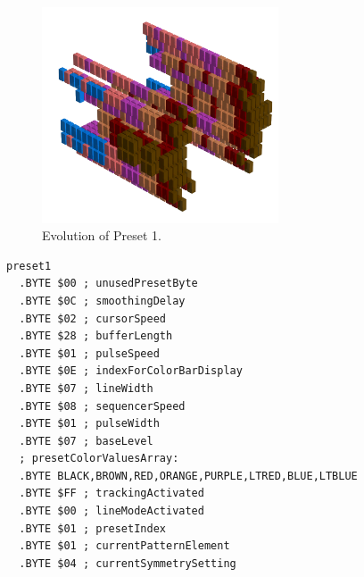 \begin{minipage}[b]{0.48\linewidth}
\begin{figure}[H]                                                          
  \centering                                                             
  \begin{adjustbox}{width=7cm,center}                                   
  \includegraphics[width=7cm]{src/presets/pattern1-45.png}%
  \end{adjustbox}                                                        
\caption{Evolution of Preset 1.}                                           
\end{figure}                                                               
\end{minipage}
\hspace{0.1cm}
\begin{minipage}[b]{0.48\linewidth}                            
                                                                           
\begin{lstlisting}[basicstyle=\ttfamily\scriptsize,caption=Data structure for Preset 1.]
preset1
  .BYTE $00 ; unusedPresetByte
  .BYTE $0C ; smoothingDelay
  .BYTE $02 ; cursorSpeed
  .BYTE $28 ; bufferLength
  .BYTE $01 ; pulseSpeed
  .BYTE $0E ; indexForColorBarDisplay
  .BYTE $07 ; lineWidth
  .BYTE $08 ; sequencerSpeed
  .BYTE $01 ; pulseWidth
  .BYTE $07 ; baseLevel
  ; presetColorValuesArray: 
  .BYTE BLACK,BROWN,RED,ORANGE,PURPLE,LTRED,BLUE,LTBLUE
  .BYTE $FF ; trackingActivated
  .BYTE $00 ; lineModeActivated
  .BYTE $01 ; presetIndex
  .BYTE $01 ; currentPatternElement
  .BYTE $04 ; currentSymmetrySetting
\end{lstlisting}
\end{minipage}
